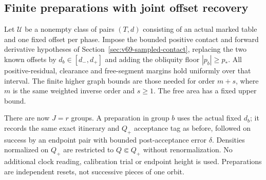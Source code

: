 \subsection{Finite preparations with joint offset recovery}

Let $\mathscr U$ be a nonempty class of pairs $(T,d)$ consisting of an
actual marked table and one fixed offset per phase.  Impose the bounded
positive contact and forward derivative hypotheses of
Section~\ref{sec:v69-sampled-contact}, replacing the two known offsets
by $d_b\in[d_-,d_+]$ and adding the obliquity floor $|p_b|\ge p_*$.
All positive-residual, clearance and free-segment margins hold uniformly
over that interval.  The finite higher graph bounds are those needed
for order $m+s$, where $m$ is the same weighted inverse order and
$s\ge1$.  The free area has a fixed upper bound.

There are now $J=r$ groups.  A preparation in group $b$ uses the actual
fixed $d_b$; it records the same exact itinerary and $Q_+$ acceptance
tag as before, followed on success by an endpoint pair with bounded
post-acceptance error $\delta$.  Densities normalized on $Q_+$ are
restricted to $Q\Subset Q_+$ without renormalization.  No additional
clock reading, calibration trial or endpoint height is used.  Preparations
are independent resets, not successive pieces of one orbit.


